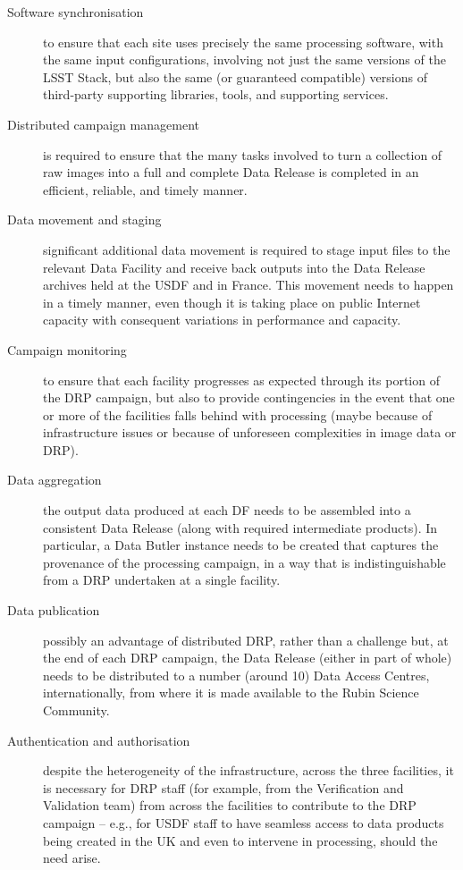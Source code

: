 \begin{description}
  
\item [Software synchronisation] to ensure that each site uses precisely the same processing software, with the same input configurations, involving not just the same versions of the LSST Stack, but also the same (or guaranteed compatible) versions of third-party supporting libraries, tools, and supporting services.
  
\item [Distributed campaign management] is required to ensure that the many tasks involved to turn a collection of raw images into a full and complete Data Release is completed in an efficient, reliable, and timely manner. 

\item [Data movement and staging] significant additional data movement is required to stage input files to the relevant Data Facility and receive back outputs into the Data Release archives held at the USDF and in France. This movement needs to happen in a timely manner, even though it is taking place on public Internet capacity with consequent variations in performance and capacity.
  
\item [Campaign monitoring] to ensure that each facility progresses as expected through its portion of the DRP campaign, but also to provide contingencies in the event that one or more of the facilities falls behind with processing (maybe because of infrastructure issues or because of unforeseen complexities in image data or DRP).

\item [Data aggregation] the output data produced at each DF needs to be assembled into a consistent Data Release (along with required intermediate products). In particular, a Data Butler instance needs to be created that captures the provenance of the processing campaign, in a way that is indistinguishable from a DRP undertaken at a single facility.
  
\item [Data publication] possibly an advantage of distributed DRP, rather than a challenge but, at the end of each DRP campaign, the Data Release (either in part of whole) needs to be distributed to a number (around 10) Data Access Centres, internationally, from where it is made available to the Rubin Science Community.

\item [Authentication and authorisation] despite the heterogeneity of the infrastructure, across the three facilities, it is necessary for DRP staff (for example, from the Verification and Validation team) from across the facilities to contribute to the DRP campaign – e.g., for USDF staff to have seamless access to data products being created in the UK and even to intervene in processing, should the need arise.
  

\end{description}
